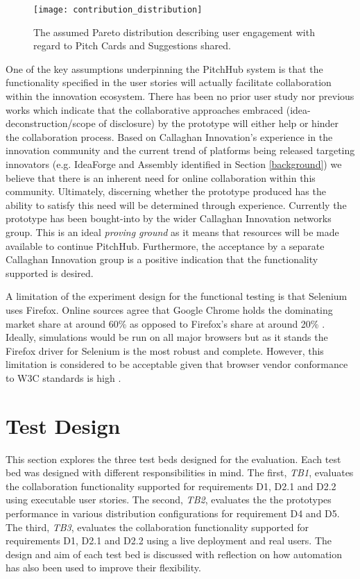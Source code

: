 \begin{figure}[ht]
    \centering
    \texttt{[image: contribution\_distribution]}
    \caption{The assumed Pareto distribution describing user engagement with regard to Pitch Cards and Suggestions shared.}
    \label{fig:contribution_distribution}
\end{figure}

One of the key assumptions underpinning the PitchHub system is that the functionality specified in the user stories will actually facilitate collaboration within the innovation ecosystem. There has been no prior user study nor previous works which indicate that the collaborative approaches embraced (idea-deconstruction/scope of disclosure) by the prototype will either help or hinder the collaboration process. Based on Callaghan Innovation's experience in the innovation community and the current trend of platforms being released targeting innovators (e.g. IdeaForge and Assembly identified in Section \ref{background}) we believe that there is an inherent need for online collaboration within this community. Ultimately, discerning whether the prototype produced has the ability to satisfy this need will be determined through experience. Currently the prototype has been bought-into by the wider Callaghan Innovation networks group. This is an ideal \textit{proving ground} as it means that resources will be made available to continue PitchHub. Furthermore, the acceptance by a separate Callaghan Innovation group is a positive indication that the functionality supported is desired.

A limitation of the experiment design for the functional testing is that Selenium uses Firefox. Online sources agree that Google Chrome holds the dominating market share at around 60\% as opposed to Firefox's share at around 20\% \cite{Brows6:online}. Ideally, simulations would be run on all major browsers but as it stands the Firefox driver for Selenium is the most robust and complete. However, this limitation is considered to be acceptable given that browser vendor conformance to W3C standards is high \cite{WebB1:online}.

\section{Test Design}
This section explores the three test beds designed for the evaluation. Each test bed was designed with different responsibilities in mind. The first, \textit{TB1}, evaluates the collaboration functionality supported for requirements D1, D2.1 and D2.2 using executable user stories. The second, \textit{TB2}, evaluates the the prototypes performance in various distribution configurations for requirement D4 and D5. The third, \textit{TB3}, evaluates the collaboration functionality supported for requirements D1, D2.1 and D2.2 using a live deployment and real users. The design and aim of each test bed is discussed with reflection on how automation has also been used to improve their flexibility.

